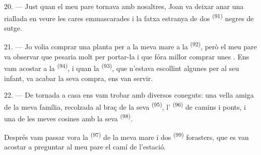 \VUsaut{3.0mm}

20. --- Just quan el meu pare tornava amb nosaltres, Joan va deixar anar una riallada en veure
les cares emmascarades i la fatxa estranya de dos
 \textsuperscript{(91)} negres de sutge.

21. --- Jo volia comprar una planta per a la meva mare a la 
\textsuperscript{(92)}, però el meu pare va observar que pesaria molt per portar-la i que fóra
millor comprar unes . Ens vam acostar a la
 \textsuperscript{(94)}, i quan la 
\textsuperscript{(93)}, que n'estava escollint algunes per al seu infant, va acabar la seva
compra, ens van servir.

22. --- De tornada a casa ens vam trobar amb diversos coneguts: una vella amiga de la meva
família, recolzada al braç de la seva  \textsuperscript{(95)},
l' \textsuperscript{(96)} de camins i ponts, i una de les meves cosines amb
la seva  \textsuperscript{(98)}.

Després vam passar vora la  \textsuperscript{(97)} de la meva mare i dos
 \textsuperscript{(99)} forasters, que es van acostar a preguntar al meu pare
el camí de l'estació.
\VUsaut{6.0mm}
\VUfilet{22mm}
